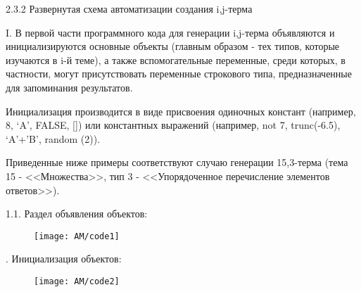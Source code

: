 2.3.2 Развернутая схема автоматизации создания i,j-терма

\foreignlanguage{english}{I}. В первой части программного кода для генерации
\foreignlanguage{english}{i},\foreignlanguage{english}{j}{}-терма объявляются и инициализируются основные объекты
(главным образом - тех типов, которые изучаются в \foreignlanguage{english}{i}{}-й теме), а также вспомогательные
переменные, среди которых, в частности, могут присутствовать переменные строкового типа, предназначенные для
запоминания результатов.

Инициализация производится в виде присвоения одиночных констант (например, 8, ‘\foreignlanguage{english}{A}’,
\foreignlanguage{english}{FALSE}, []) или константных выражений (например, \foreignlanguage{english}{not} 7,
\foreignlanguage{english}{trunc}(-6.5), ‘\foreignlanguage{english}{A}’+’\foreignlanguage{english}{B}’,
\foreignlanguage{english}{random} (2)).

Приведенные ниже примеры соответствуют случаю генерации 15,3-терма (тема 15 - <<Множества>>, тип 3 - <<Упорядоченное
перечисление элементов ответов>>).

{\centering
	\foreignlanguage{english}{1.1. }Раздел\foreignlanguage{english}{ }объявления\foreignlanguage{english}{
	}объектов\foreignlanguage{english}{:}
	\par}

	\begin{figure}[H]
		\texttt{[image: AM/code1]}
	\end{figure}

%
%
%
%
%

{. Инициализация объектов:
	\par}

	\begin{figure}[H]
		\texttt{[image: AM/code2]}
	\end{figure}

